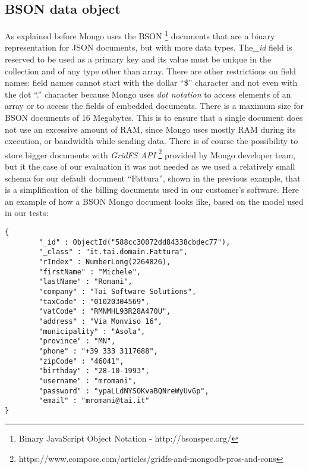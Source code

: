 \subsection{BSON data object}
As explained before Mongo uses the BSON \footnote{Binary JavaScript Object Notation - http://bsonspec.org/} documents that are a binary representation for JSON documents, but with more data types.
The\textit{\_id} field is reserved to be used as a primary key and its value must be unique in the collection and of any type other than array.
There are other restrictions on field names: field names cannot start with the dollar “\$” character and not even with the dot “.” character because Mongo uses \textit{dot notation} to access elements of an array or to access the fields of embedded documents.
There is a maximum size for BSON documents of 16 Megabytes. This is to ensure that a single document does not use an excessive amount of RAM, since Mongo uses mostly RAM during its execution, or bandwidth while sending data.
There is of course the possibility to store bigger documents with \textit{GridFS API} \footnote{https://www.compose.com/articles/gridfs-and-mongodb-pros-and-cons} provided by Mongo developer team, but it the case of our evaluation it was not needed as we used a relatively small schema for our default document “Fattura”, shown in the previous example, that is a simplification of the billing documents used in our customer’s software.
Here an example of how a BSON Mongo document looks like, based on the model used in our tests:
\begin{lstlisting}
{
        "_id" : ObjectId("588cc30072dd84338cbdec77"),
        "_class" : "it.tai.domain.Fattura",
        "rIndex" : NumberLong(2264826),
        "firstName" : "Michele",
        "lastName" : "Romani",
        "company" : "Tai Software Solutions",
        "taxCode" : "01020304569",
        "vatCode" : "RMNMHL93R28A470U",
        "address" : "Via Monviso 16",
        "municipality" : "Asola",
        "province" : "MN",
        "phone" : "+39 333 3117688",
        "zipCode" : "46041",
        "birthday" : "28-10-1993",
        "username" : "mromani",
        "password" : "ypaLLdNYSOKvaBQNreWyUvGp",
        "email" : "mromani@tai.it"
}
\end{lstlisting}

